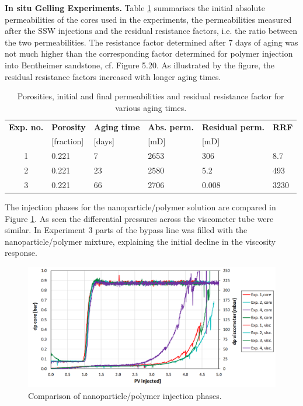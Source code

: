 \documentclass[journal = enfuem, manuscript =  article]{achemso}
\begin{document}
\textbf{In situ Gelling Experiments.}
Table \ref{tab:porPermAge} summarises the initial absolute permeabilities of the cores used in the experiments, the permeabilities measured after the SSW injections and the residual resistance factors, i.e. the ratio between the two permeabilities. The resistance factor determined after 7 days of aging was not much higher than the corresponding factor determined for polymer injection into Bentheimer sandstone, cf. Figure 5.20. As illustrated by the figure, the residual resistance factors increased with longer aging times.
\begin{table}
\small
\centering
\caption{Porosities, initial and final permeabilities and residual resistance factor for various aging times.}
\label{tab:porPermAge} %
\begin{tabular}{c l l l l l } 
\toprule
\textbf{Exp. no.} & \textbf{Porosity} & \textbf{Aging time} & \textbf{Abs. perm.} & \textbf{Residual perm.} & \textbf{RRF} \\ 
 & [fraction] & [days] & [mD] & [mD] & \\
\midrule 
1  & 0.221   &  7     & 2653     & 306      & 8.7    \\
2  & 0.221   & 23     & 2580     & 5.2      & 493      \\ 
3  & 0.221   & 66     & 2706     & 0.008    & 3230   \\ 
\bottomrule
\end{tabular}
\end{table}

The injection phases for the nanoparticle/polymer solution are compared in Figure \ref{cht:gelexp_sum}. As seen the differential pressures across the viscometer tube were similar. In Experiment 3 parts of the bypass line was filled with the nanoparticle/polymer mixture, explaining the initial decline in the viscosity response. 

\begin{figure}[h!]
    \centering
    \includegraphics[width=\textwidth]{fig/gelexp_sum.png}
    \caption{Comparison of nanoparticle/polymer injection phases.}
    \label{cht:gelexp_sum} %
\end{figure}
 
\end{document}
